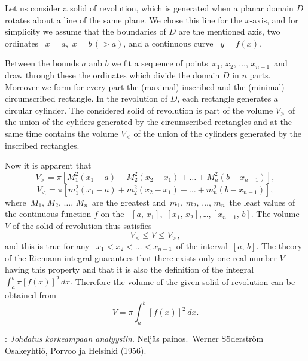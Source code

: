 \documentclass[12pt]{article}
\theoremstyle{definition}
\begin{document}
  


Let us consider a solid of revolution, which is generated when a planar domain $D$ rotates about a line of the same plane.  We chose this line for the $x$-axis, and for simplicity we assume that the boundaries of $D$ are the mentioned axis, two ordinates \, $x = a$,\, $x = b\,(> a)$, and a continuous curve \, $y = f(x)$.

Between the bounds $a$ anb $b$ we fit a sequence of points\, $x_1,\,x_2,\,\ldots,\,x_{n-1}$\, and draw through these the ordinates which divide the domain $D$ in $n$ parts.  Moreover we form for every part the (maximal) inscribed and the (minimal) circumscribed rectangle.  In the revolution of $D$, each rectangle generates a circular cylinder.  The considered solid of revolution is part of the volume $V_>$ of the union of the cyliders generated by the circumscribed rectangles and at the same time contains the volume $V_<$ of the union of the cylinders generated by the inscribed rectangles.

Now it is apparent that
$$V_> = \pi[M_1^2(x_1-a)+M_2^2(x_2-x_1)+\ldots+M_n^2(b-x_{n-1})],$$
$$V_< = \pi[m_1^2(x_1-a)+m_2^2(x_2-x_1)+\ldots+m_n^2(b-x_{n-1})],$$
where\, $M_1,\,M_2,\,\ldots,\,M_n$\, are the greatest and\, $m_1,\,m_2,\,\ldots,\,m_n$\, the least values of the continuous function $f$ on the  \, $[a,\,x_1]$,\, $[x_1,\,x_2]$,\,\ldots,\,$[x_{n-1},\,b]$.  The volume $V$ of the solid of revolution thus satisfies
                   $$V_< \le V \le V_>,$$
and this is true for any \, $x_1 < x_2 < \ldots < x_{n-1}$\, of the interval\, $[a,\,b]$.  
The theory of the Riemann integral guarantees that there exists only one real number $V$ having this property and that it is also the definition of the integral $\displaystyle\int_a^b\!\pi[f(x)]^2\,dx.$  Therefore the volume of the given solid of revolution can be obtained from
                $$V = \pi\int_a^b[f(x)]^2\,dx.$$



\begin{thebibliography}{8}
: {\em Johdatus korkeampaan analyysiin}. Nelj\"as painos.\, Werner S\"oderstr\"om Osakeyhti\"o, Porvoo ja Helsinki (1956).
\end{thebibliography} 

\end{document}
